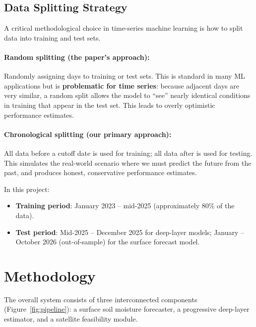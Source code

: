 \documentclass[12pt, a4paper]{article}
\begin{document}
\subsection{Data Splitting Strategy}

A critical methodological choice in time-series machine learning is how to split data into training and test sets.

\paragraph{Random splitting (the paper's approach):} Randomly assigning days to training or test sets. This is standard in many ML applications but is \textbf{problematic for time series}: because adjacent days are very similar, a random split allows the model to ``see'' nearly identical conditions in training that appear in the test set. This leads to overly optimistic performance estimates.

\paragraph{Chronological splitting (our primary approach):} All data before a cutoff date is used for training; all data after is used for testing. This simulates the real-world scenario where we must predict the future from the past, and produces honest, conservative performance estimates.

In this project:
\begin{itemize}
    \item \textbf{Training period}: January 2023 -- mid-2025 (approximately 80\% of the data).
    \item \textbf{Test period}: Mid-2025 -- December 2025 for deep-layer models; January -- October 2026 (out-of-sample) for the surface forecast model.
\end{itemize}


\section{Methodology}

The overall system consists of three interconnected components (Figure~\ref{fig:pipeline}): a surface soil moisture forecaster, a progressive deep-layer estimator, and a satellite feasibility module.
\end{document}
